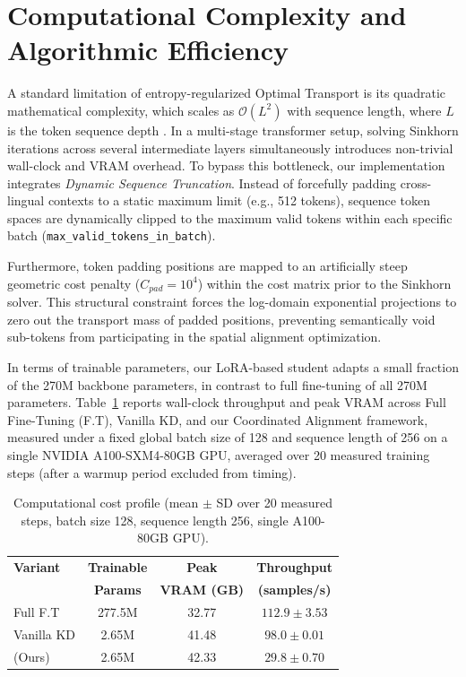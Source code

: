 \documentclass[11pt]{article}
\begin{document}
\section{Computational Complexity and Algorithmic Efficiency}
\label{sec:appendix_complexity}
A standard limitation of entropy-regularized Optimal Transport is its quadratic mathematical complexity, which scales as $\mathcal{O}(L^2)$ with sequence length, where $L$ is the token sequence depth \cite{cuturi2013sinkhorndistanceslightspeedcomputation}. In a multi-stage transformer setup, solving Sinkhorn iterations across several intermediate layers simultaneously introduces non-trivial wall-clock and VRAM overhead. To bypass this bottleneck, our implementation integrates \textit{Dynamic Sequence Truncation}. Instead of forcefully padding cross-lingual contexts to a static maximum limit (e.g., 512 tokens), sequence token spaces are dynamically clipped to the maximum valid tokens within each specific batch (\texttt{max\_valid\_tokens\_in\_batch}).

Furthermore, token padding positions are mapped to an artificially steep geometric cost penalty ($C_{pad} = 10^4$) within the cost matrix prior to the Sinkhorn solver. This structural constraint forces the log-domain exponential projections to zero out the transport mass of padded positions, preventing semantically void sub-tokens from participating in the spatial alignment optimization. 

In terms of trainable parameters, our LoRA-based student adapts a small fraction of the 270M backbone parameters, in contrast to full fine-tuning of all 270M parameters. Table~\ref{tab:compute_cost} reports wall-clock throughput and peak VRAM across Full Fine-Tuning (F.T), Vanilla KD, and our Coordinated Alignment framework, measured under a fixed global batch size of 128 and sequence length of 256 on a single NVIDIA A100-SXM4-80GB GPU, averaged over 20 measured training steps (after a warmup period excluded from timing).

\begin{table}[H]
\centering
\small
\begin{tabular}{lccc}
\toprule
\textbf{Variant} & \textbf{Trainable} & \textbf{Peak} & \textbf{Throughput} \\
 & \textbf{Params} & \textbf{VRAM (GB)} & \textbf{(samples/s)} \\
\midrule
Full F.T & 277.5M & 32.77 & $112.9 \pm 3.53$ \\
Vanilla KD & 2.65M & 41.48 & $98.0 \pm 0.01$ \\
(Ours) & 2.65M & 42.33 & $29.8 \pm 0.70$ \\
\bottomrule
\end{tabular}
\caption{Computational cost profile (mean $\pm$ SD over 20 measured steps, batch size 128, sequence length 256, single A100-80GB GPU).}
\label{tab:compute_cost}
\end{table}
\end{document}

